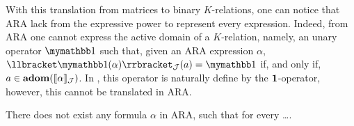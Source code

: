 With this translation from \lang matrices to binary $K$-relations, one can notice that ARA lack from the expressive power to represent every \lang expression. Indeed, from ARA one cannot express the active domain of a $K$-relation, namely, an unary operator $\kone$ such that, given an ARA expression $\alpha$, $\ssem{\kone(\alpha)}{\cJ}(a) = \kone$ if, and only if, $a \in \mathbf{adom}(\llbracket \alpha \rrbracket_{\mathcal{J}})$. In \lang, this operator is naturally define by the $\mathbf{1}$-operator, however, this cannot be translated in ARA.
\begin{lemma}
	There does not exist any formula $\alpha$ in ARA, such that for every \ldots.
\end{lemma}




%
%
%

